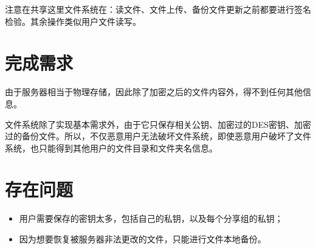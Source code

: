 \documentclass[11pt, oneside]{ctexart}
\begin{document}
注意在共享这里文件系统在：读文件、文件上传、备份文件更新之前都要进行签名检验。其余操作类似用户文件读写。

\section{完成需求}
由于服务器相当于物理存储，因此除了加密之后的文件内容外，得不到任何其他信息。

文件系统除了实现基本需求外，由于它只保存相关公钥、加密过的DES密钥、加密过的备份文件。所以，不仅恶意用户无法破坏文件系统，即使恶意用户破坏了文件系统，也只能得到其他用户的文件目录和文件夹名信息。

\section{存在问题}
\begin{itemize}
\item 用户需要保存的密钥太多，包括自己的私钥，以及每个分享组的私钥；
\item 因为想要恢复被服务器非法更改的文件，只能进行文件本地备份。
\end{itemize}
\end{document}
